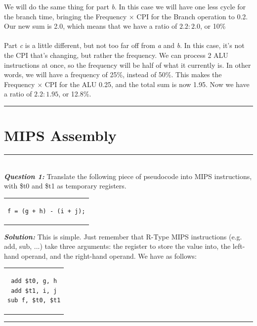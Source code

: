 \documentclass{article}
\begin{document}
\noindent We will do the same thing for part \textit{b}. In this case we will have one less cycle for the branch time, bringing the Frequency $\times$ CPI for the Branch operation to 0.2. Our new sum is 2.0, which means that we have a ratio of $2.2 : 2.0$, or 10\%\\\\
\noindent Part \textit{c} is a little different, but not too far off from \textit{a} and \textit{b}. In this case, it's not the CPI that's changing, but rather the frequency. We can process 2 ALU instructions at once, so the frequency will be half of what it currently is. In other words, we will have a frequency of 25\%, instead of 50\%. This makes the Frequency $\times$ CPI for the ALU 0.25, and the total sum is now 1.95. Now we have a ratio of $2.2 : 1.95$, or 12.8\%.\\
\hrule
\newpage


\section*{MIPS Assembly}
\hrule
\noindent\\
\indent \textit{\textbf{Question 1:}} Translate the following piece of pseudocode into MIPS instructions, with \$t0 and \$t1 as temporary registers.
\begin{center} 
\begin{tabular}{c}
\begin{lstlisting}
f = (g + h) - (i + j);
\end{lstlisting}
\end{tabular}
\end{center}
\noindent \textit{\textbf{Solution:}} This is simple. Just remember that R-Type MIPS instructions (e.g. add, sub, ...)  take three arguments: the register to store the value into, the left-hand operand, and the right-hand operand. We have as follows:
\begin{center} 
\begin{tabular}{c}
\begin{lstlisting}
add $t0, g, h
add $t1, i, j
sub f, $t0, $t1
\end{lstlisting}
\end{tabular}
\end{center}
\hrule
\noindent \\
\end{document}
